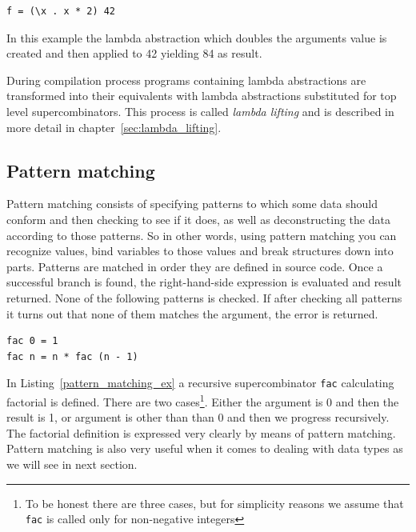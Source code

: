\documentclass[12pt,a4paper]{report}
\begin{document}
\vspace*{0.2in}
\begin{lstlisting}[style=haskell,label=lambda_ex,caption={Lambda abstraction}]
f = (\x . x * 2) 42
\end{lstlisting}

In this example the lambda abstraction which doubles the arguments value is
created and then applied to 42 yielding 84 as result.

During compilation process programs containing lambda abstractions are
transformed into their equivalents with lambda abstractions substituted for top
level supercombinators. This process is called \textit{lambda lifting} and is
described in more detail in chapter~\ref{sec:lambda_lifting}.

\subsection{Pattern matching}

Pattern matching consists of specifying patterns to which some data should
conform and then checking to see if it does, as well as deconstructing the data
according to those patterns. So in other words, using pattern matching you can
recognize values, bind variables to those values and break structures down into
parts.
Patterns are matched in order they are defined in source code. Once a
successful branch is found, the right-hand-side expression is evaluated and
result returned. None of the following patterns is checked. If after checking
all patterns it turns out that none of them matches the argument, the error is
returned.

\vspace*{0.2in}
\begin{lstlisting}[style=haskell,label=pattern_matching_ex,caption={Factorial using pattern matching.}]
fac 0 = 1
fac n = n * fac (n - 1)
\end{lstlisting}

In Listing~\ref{pattern_matching_ex} a recursive supercombinator \texttt{fac}
calculating factorial is defined. There are two cases\footnote{To be honest
there are three cases, but for simplicity reasons we assume that
\texttt{fac} is called only for non-negative integers}. Either the
argument is 0 and then the result is 1, or argument is other than than 0 and
then we progress recursively. The factorial definition is expressed very
clearly by means of pattern matching.
Pattern matching is also very useful when it comes to dealing with data
types as we will see in next section.
\end{document}

